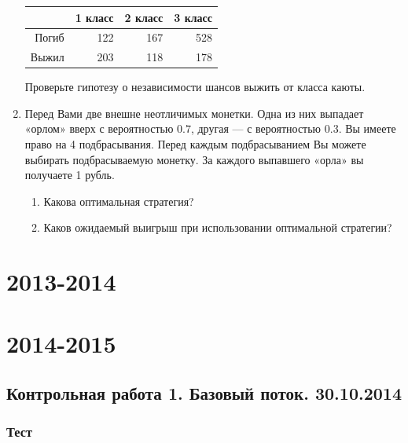 \documentclass[12pt, a4paper]{article}\usepackage[]{graphicx}\usepackage[]{color}
\begin{document}
\begin{enumerate}
\begin{table}[ht]
\centering
\begin{tabular}{rrrr}
  \hline
 & 1 класс & 2 класс & 3 класс \\ 
  \hline
Погиб & 122 & 167 & 528 \\ 
  Выжил & 203 & 118 & 178 \\ 
   \hline
\end{tabular}
\end{table}


Проверьте гипотезу о независимости шансов выжить от класса каюты.

\item Перед Вами две внешне неотличимых монетки. Одна из них выпадает «орлом» вверх с вероятностью $0.7$, другая — с вероятностью $0.3$. Вы имеете право на 4 подбрасывания. Перед каждым подбрасыванием Вы можете выбирать подбрасываемую монетку. За каждого выпавшего «орла» вы получаете 1 рубль.
\begin{enumerate}
\item Какова оптимальная стратегия?
\item Каков ожидаемый выигрыш при использовании оптимальной стратегии?
\end{enumerate}

\end{enumerate}

\section{2013-2014}



\section{2014-2015}


\subsection{Контрольная работа 1. Базовый поток. 30.10.2014}
\subsubsection*{Тест}
\end{document}
